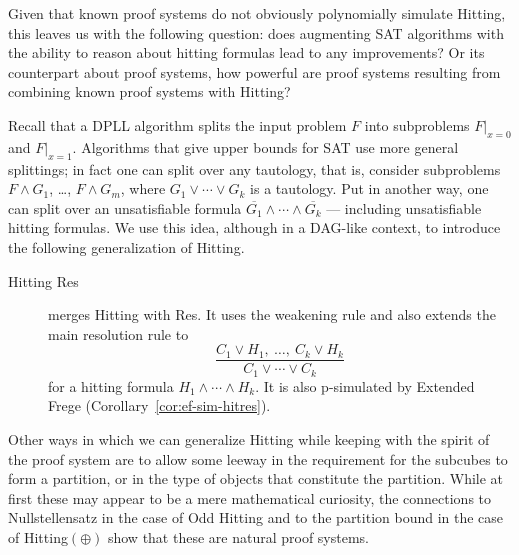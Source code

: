 \documentclass[11pt]{article}
\newcommand{\scterm}[1]{{\textrm{\sc #1}}}
\newcommand{\hit}{\scterm{Hitting}}
\newcommand{\res}{\scterm{Res}}
\newcommand{\F}{\scterm{Frege}}
\newcommand{\EF}{\scterm{Extended {\F}}}
\newcommand{\hitres}{{\hit} {\res}}
\newcommand{\hitp}{{\hit}$(\oplus)$}
\newcommand{\hitodd}{\scterm{Odd} {\hit}}
\newcommand{\olnot}[1]{\overline{#1}}
\numberwithin{equation}{section}
\begin{document}
Given that known proof systems do not obviously polynomially simulate {\hit}, this leaves us with the following question: does augmenting SAT algorithms with the ability to reason about hitting  formulas lead to any improvements? Or its counterpart about proof systems, how powerful are proof systems resulting from combining known proof systems with {\hit}?

Recall that a DPLL algorithm splits the input problem $F$ into subproblems $F|_{x=0}$ and $F|_{x=1}$.
Algorithms that give upper bounds for SAT use more general splittings; in fact
one can split over any tautology, that is,
consider subproblems $F\land G_1$, \ldots , $F\land G_m$,
where $G_1\lor\dotsb\lor G_k$ is a tautology.
Put in another way, one can split over an unsatisfiable formula $\olnot{G_1}\land\dotsb\land \olnot{G_k}$ ---
including unsatisfiable hitting formulas.
We use this idea, although in a DAG-like context, to introduce the following generalization of {\hit}.
\begin{description}
\item[{\hitres}] merges {\hit} with {\res}. It uses the weakening rule and also extends the main
resolution rule to
\[
\frac{C_1\lor H_1,\ \dotsc,\ C_k\lor H_k}{C_1\lor\dotsb\lor C_k}
\]
for a hitting formula $H_1\land\dotsb\land H_k$.
It is also p-simulated by {\EF} (Corollary~\ref{cor:ef-sim-hitres}).
\end{description}

Other ways in which we can generalize {\hit} while keeping with the spirit of the proof system are to allow some leeway in the requirement for the subcubes to form a partition, or in the type of objects that constitute the partition. While at first these may appear to be a mere mathematical curiosity, the connections to Nullstellensatz in the case of {\hitodd} and to the partition bound in the case of {\hitp} show that these are natural proof systems.
\end{document}
